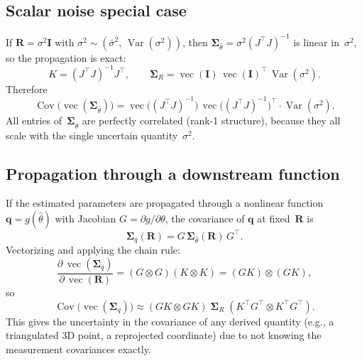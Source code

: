 \documentclass[11pt]{article}
\newcommand{\vect}{\operatorname{vec}}
\newcommand{\Cov}{\operatorname{Cov}}
\newcommand{\Var}{\operatorname{Var}}
\begin{document}
\subsection{Scalar noise special case}

If $\mathbf{R} = \sigma^2 \mathbf{I}$ with $\sigma^2 \sim
(\bar\sigma^2,\, \Var(\sigma^2))$, then
$\boldsymbol{\Sigma}_{\hat\theta} = \sigma^2 (J^\top J)^{-1}$
is linear in~$\sigma^2$, so the propagation is exact:
\begin{equation}
  K = (J^\top J)^{-1} J^\top,
  \qquad
  \boldsymbol{\Sigma}_{\!R} = \vect(\mathbf{I})\,
    \vect(\mathbf{I})^\top\, \Var(\sigma^2).
\end{equation}
Therefore
\begin{equation}
  \Cov\!\bigl(\vect(\boldsymbol{\Sigma}_{\hat\theta})\bigr)
    = \vect\!\bigl((J^\top J)^{-1}\bigr)\,
      \vect\!\bigl((J^\top J)^{-1}\bigr)^\top
      \cdot \Var(\sigma^2).
\end{equation}
All entries of~$\boldsymbol{\Sigma}_{\hat\theta}$ are perfectly correlated
(rank-1 structure), because they all scale with the single uncertain
quantity~$\sigma^2$.

\subsection{Propagation through a downstream function}

If the estimated parameters are propagated through a nonlinear function
$\mathbf{q} = g(\hat\theta)$ with Jacobian
$G = \partial g / \partial \theta$, the covariance of $\mathbf{q}$
at fixed~$\mathbf{R}$ is
\begin{equation}
  \boldsymbol{\Sigma}_q(\mathbf{R})
    = G\,\boldsymbol{\Sigma}_{\hat\theta}(\mathbf{R})\, G^\top.
\end{equation}
Vectorizing and applying the chain rule:
\begin{equation}
  \frac{\partial\,\vect(\boldsymbol{\Sigma}_q)}
       {\partial\,\vect(\mathbf{R})}
    = (G \otimes G)(K \otimes K)
    = (GK) \otimes (GK),
\end{equation}
so
\begin{equation}
  \boxed{
    \Cov\!\bigl(\vect(\boldsymbol{\Sigma}_q)\bigr)
      \approx
      (GK \otimes GK)\;
      \boldsymbol{\Sigma}_{\!R}\;
      (K^\top G^\top \otimes K^\top G^\top).
  }
\end{equation}
This gives the uncertainty in the covariance of any derived quantity
(e.g., a triangulated 3D point, a reprojected coordinate) due to
not knowing the measurement covariances exactly.
\end{document}
